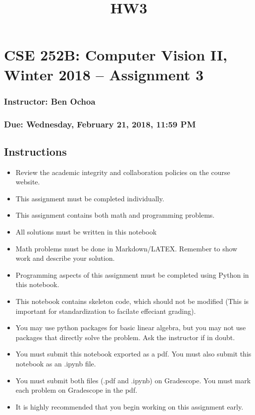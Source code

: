\documentclass[11pt]{article}
\title{HW3}
\providecommand{\tightlist}{%
      \setlength{\itemsep}{0pt}\setlength{\parskip}{0pt}}
\begin{document}
    
    
    \maketitle
    
    

    
    \section{CSE 252B: Computer Vision II, Winter 2018 -- Assignment
3}\label{cse-252b-computer-vision-ii-winter-2018-assignment-3}

\subsubsection{Instructor: Ben Ochoa}\label{instructor-ben-ochoa}

\subsubsection{Due: Wednesday, February 21, 2018, 11:59
PM}\label{due-wednesday-february-21-2018-1159-pm}

    \subsection{Instructions}\label{instructions}

\begin{itemize}
\tightlist
\item
  Review the academic integrity and collaboration policies on the course
  website.
\item
  This assignment must be completed individually.
\item
  This assignment contains both math and programming problems.
\item
  All solutions must be written in this notebook
\item
  Math problems must be done in Markdown/LATEX. Remember to show work
  and describe your solution.
\item
  Programming aspects of this assignment must be completed using Python
  in this notebook.
\item
  This notebook contains skeleton code, which should not be modified
  (This is important for standardization to facilate effeciant grading).
\item
  You may use python packages for basic linear algebra, but you may not
  use packages that directly solve the problem. Ask the instructor if in
  doubt.
\item
  You must submit this notebook exported as a pdf. You must also submit
  this notebook as an .ipynb file.
\item
  You must submit both files (.pdf and .ipynb) on Gradescope. You must
  mark each problem on Gradescope in the pdf.
\item
  It is highly recommended that you begin working on this assignment
  early.
\end{itemize}
\end{document}
